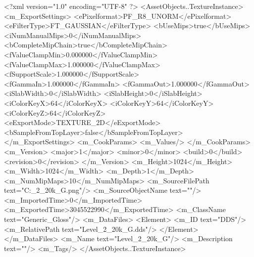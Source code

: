 <?xml version="1.0" encoding="UTF-8" ?>
<AssetObjects..TextureInstance>
	<m_ExportSettings>
		<ePixelformat>PF_R8_UNORM</ePixelformat>
		<eFilterType>FT_GAUSSIAN</eFilterType>
		<bUseMips>true</bUseMips>
		<iNumManualMips>0</iNumManualMips>
		<bCompleteMipChain>true</bCompleteMipChain>
		<fValueClampMin>0.000000</fValueClampMin>
		<fValueClampMax>1.000000</fValueClampMax>
		<fSupportScale>1.000000</fSupportScale>
		<fGammaIn>1.000000</fGammaIn>
		<fGammaOut>1.000000</fGammaOut>
		<iSlabWidth>0</iSlabWidth>
		<iSlabHeight>0</iSlabHeight>
		<iColorKeyX>64</iColorKeyX>
		<iColorKeyY>64</iColorKeyY>
		<iColorKeyZ>64</iColorKeyZ>
		<eExportMode>TEXTURE_2D</eExportMode>
		<bSampleFromTopLayer>false</bSampleFromTopLayer>
	</m_ExportSettings>
	<m_CookParams>
		<m_Values/>
	</m_CookParams>
	<m_Version>
		<major>1</major>
		<minor>0</minor>
		<build>0</build>
		<revision>0</revision>
	</m_Version>
	<m_Height>1024</m_Height>
	<m_Width>1024</m_Width>
	<m_Depth>1</m_Depth>
	<m_NumMipMaps>10</m_NumMipMaps>
	<m_SourceFilePath text="C:\Users\Shadow\Desktop\Prototypes\Level_2_20k_G.png"/>
	<m_SourceObjectName text=""/>
	<m_ImportedTime>0</m_ImportedTime>
	<m_ExportedTime>3045522990</m_ExportedTime>
	<m_ClassName text="Generic_Gloss"/>
	<m_DataFiles>
		<Element>
			<m_ID text="DDS"/>
			<m_RelativePath text="Level_2_20k_G.dds"/>
		</Element>
	</m_DataFiles>
	<m_Name text="Level_2_20k_G"/>
	<m_Description text=""/>
	<m_Tags/>
</AssetObjects..TextureInstance>

